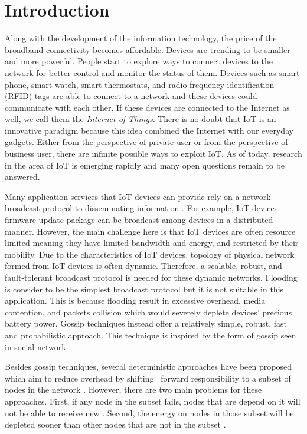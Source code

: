 \chapter{Introduction}
\label{Chapter1}

Along with the development of the information technology, the price of the broadband connectivity becomes affordable. Devices are trending to be smaller and more powerful. People start to explore ways to connect devices to the network for better control and monitor the status of them. Devices such as smart phone, smart watch, smart thermostats, and radio-frequency identification (RFID) tags are able to connect to a network and these devices could communicate with each other. If these devices are connected to the Internet as well, we call them the \textit{Internet of Things}. There is no doubt that IoT is an innovative paradigm \cite{Atzori} because this idea combined the Internet with our everyday gadgets. Either from the perspective of private user or from the perspective of business user, there are infinite possible ways to exploit IoT. As of today, research in the area of IoT is emerging rapidly and many open questions remain to be answered.

Many application services that IoT devices can provide rely on a network broadcast protocol to disseminating information \cite{smart}. For example, IoT devices firmware update package can be broadcast among devices in a distributed manner. However, the main challenge here is that IoT devices are often resource limited meaning they have limited bandwidth and energy, and restricted by their mobility. Due to the characteristics of IoT devices, topology of physical network formed from IoT devices is often dynamic. Therefore, a scalable, robust, and fault-tolerant broadcast protocol is needed for these dynamic networks. Flooding is consider to be the simplest broadcast protocol but it is not suitable in this application. This is because flooding result in excessive overhead, media contention, and packets collision \cite{tseng2002broadcast} which would severely deplete devices' precious battery power. Gossip techniques instead offer a relatively simple, robust, fast and probabilistic approach. This technique is inspired by the form of gossip seen in social network.

Besides gossip techniques, several deterministic approaches have been proposed which aim to reduce overhead by shifting \msg ~forward responsibility to a subset of nodes in the network \cite{smart}. However, there are two main problems for these approaches. First, if any node in the subset fails, nodes that are depend on it will not be able to receive new \msgs \cite{smart}. Second, the energy on nodes in those subset will be depleted sooner than other nodes that are not in the subset \cite{smart}.

